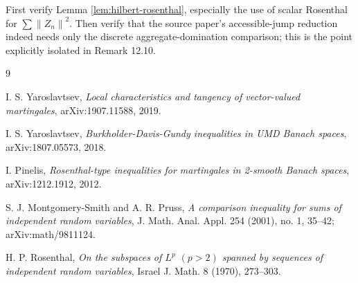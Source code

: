 \documentclass[11pt]{article}
\newcommand{\norm}[1]{\left\lVert #1\right\rVert}
\begin{document}
First verify Lemma \ref{lem:hilbert-rosenthal}, especially the use of scalar
Rosenthal for \(\sum\norm{Z_n}^2\).  Then verify that the source paper's
accessible-jump reduction indeed needs only the discrete aggregate-domination
comparison; this is the point explicitly isolated in Remark 12.10.

\begin{thebibliography}{9}

I. S. Yaroslavtsev,
\emph{Local characteristics and tangency of vector-valued martingales},
arXiv:1907.11588, 2019.

I. S. Yaroslavtsev,
\emph{Burkholder-Davis-Gundy inequalities in UMD Banach spaces},
arXiv:1807.05573, 2018.

I. Pinelis,
\emph{Rosenthal-type inequalities for martingales in 2-smooth Banach spaces},
arXiv:1212.1912, 2012.

S. J. Montgomery-Smith and A. R. Pruss,
\emph{A comparison inequality for sums of independent random variables},
J. Math. Anal. Appl. 254 (2001), no. 1, 35--42;
arXiv:math/9811124.

H. P. Rosenthal,
\emph{On the subspaces of \(L^p\) \((p>2)\) spanned by sequences of
independent random variables},
Israel J. Math. 8 (1970), 273--303.

\end{thebibliography}
\end{document}
